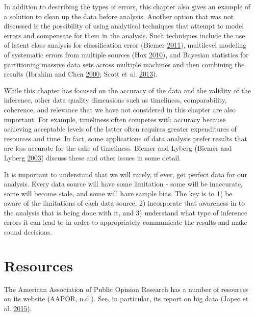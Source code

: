 \documentclass[]{krantz}
\begin{document}
In addition to describing the types of errors, this chapter also gives
an example of a solution to clean up the data before analysis. Another
option that was not discussed is the possibility of using analytical
techniques that attempt to model errors and compensate for them in the
analysis. Such techniques include the use of latent class analysis for
classification error (Biemer
\protect\hyperlink{ref-biemer2011latent}{2011}), multilevel modeling of
systematic errors from multiple sources (Hox
\protect\hyperlink{ref-hox2010multilevel}{2010}), and Bayesian
statistics for partitioning massive data sets across multiple machines
and then combining the results (Ibrahim and Chen
\protect\hyperlink{ref-ibrahim2000power}{2000}; Scott et al.
\protect\hyperlink{ref-scott2013bayes}{2013}).

While this chapter has focused on the accuracy of the data and the
validity of the inference, other data quality dimensions such as
timeliness, comparability, coherence, and relevance that we have not
considered in this chapter are also important. For example, timeliness
often competes with accuracy because achieving acceptable levels of the
latter often requires greater expenditures of resources and time. In
fact, some applications of data analysis prefer results that are less
accurate for the sake of timeliness. Biemer and Lyberg (Biemer and
Lyberg \protect\hyperlink{ref-biemer2003}{2003}) discuss these and other
issues in some detail.

It is important to understand that we will rarely, if ever, get perfect
data for our analysis. Every data source will have some limitation -
some will be inaccurate, some will become stale, and some will have
sample bias. The key is to 1) be aware of the limitations of each data
source, 2) incorporate that awareness in to the analysis that is being
done with it, and 3) understand what type of inference errors it can
lead to in order to appropriately communicate the results and make sound
decisions.

\vspace*{6pt}

\section{Resources}\label{resources-5}

The American Association of Public Opinion Research has a number of
resources on its website (AAPOR, n.d.). See, in particular, its report
on big data (Japec et al. \protect\hyperlink{ref-japec2015big}{2015}).
\end{document}
